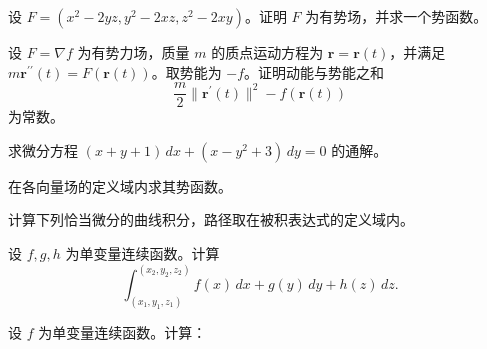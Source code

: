 \noindent\begin{minipage}{\textwidth}
设 $F=(x^2-2yz,y^2-2xz,z^2-2xy)$。证明 $F$ 为有势场，并求一个势函数。
\end{minipage}\par\vfill
\newpage
\noindent\begin{minipage}{\textwidth}
设 $F=\nabla f$ 为有势力场，质量 $m$ 的质点运动方程为 $\mathbf r=\mathbf r(t)$，并满足 $m\mathbf r^{\prime\prime}(t)=F(\mathbf r(t))$。取势能为 $-f$。证明动能与势能之和\[\frac m2\|\mathbf r^{\prime}(t)\|^2-f(\mathbf r(t))\]为常数。
\end{minipage}\par\vfill
\noindent\begin{minipage}{\textwidth}
求微分方程 $(x+y+1)\,dx+(x-y^2+3)\,dy=0$ 的通解。
\end{minipage}\par\vfill
\noindent\begin{minipage}{\textwidth}
在各向量场的定义域内求其势函数。
\end{minipage}\par\vfill
\newpage
\noindent\begin{minipage}{\textwidth}
计算下列恰当微分的曲线积分，路径取在被积表达式的定义域内。
\end{minipage}\par\vfill
\noindent\begin{minipage}{\textwidth}
设 $f,g,h$ 为单变量连续函数。计算\[\int_{(x_1,y_1,z_1)}^{(x_2,y_2,z_2)}f(x)\,dx+g(y)\,dy+h(z)\,dz.\]
\end{minipage}\par\vfill
\noindent\begin{minipage}{\textwidth}
设 $f$ 为单变量连续函数。计算：
\end{minipage}\par\vfill

